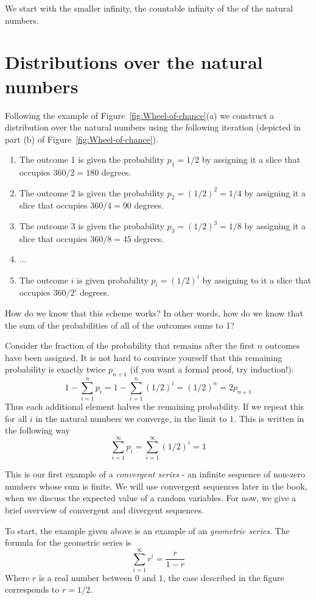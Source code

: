 We start with the smaller infinity, the countable infinity of the of the natural numbers.

\section{Distributions over the natural numbers}
Following the example of Figure~\ref{fig:Wheel-of-chance}(a) we
construct a distribution over the natural numbers using the following
iteration (depicted in part (b) of Figure~\ref{fig:Wheel-of-chance}).
\begin{enumerate}
\item The outcome 1 is given the probability $p_1=1/2$ by assigning it a
  slice that occupies $360/2 = 180$ degrees.
\item The outcome 2 is given the probability $p_2=(1/2)^2=1/4$ by
  assigning it a slice that occupies $360/4=90$ degrees. 
\item The outcome 3 is given the probability $p_3=(1/2)^3=1/8$ by
  assigning it a slice that occupies $360/8=45$ degrees.
\item ...
\item The outcome $i$ is given probability $p_i=(1/2)^i$ by assigning to
  it a slice that occupies $360/2^i$ degrees. 
\end{enumerate}

How do we know that this scheme works? In other words, how do we know
that the sum of the probabilities of all of the outcomes sums to 1?

Consider the fraction of the probability that remains after the first
$n$ outcomes have been assigned. It is not hard to convince yourself
that this remaining probability is exactly twice $p_{n+1}$ (if you
want a formal proof, try induction!):
\[
1-\sum_{i=1}^n p_i = 1-\sum_{i=1}^n (1/2)^i = (1/2)^n= 2p_{n+1}
\]
Thus each additional element halves the remaining probability. If we
repeat this for all $i$ in the natural numbers we converge, in the
limit to $1$. This is written in the following way
\[
\sum_{i=1}^{\infty} p_i = \sum_{i=1}^{\infty} (1/2)^i = 1
\]

This is our first example of a {\em convergent series} - an infinite
sequence of non-zero numbers whose sum is finite. We will use
convergent sequences later in the book, when we discuss the expected
value of a random variables. For now, we give a brief overview of
convergent and divergent sequences.

To start, the example given above is an example of an {\em geometric
  series}. The formula for the geometric series is 
\[
\sum_{i=1}^{\infty} r^i = \frac{r}{1-r}
\]
Where $r$ is a real number between $0$ and $1$, the case described in
the figure corresponds to $r=1/2$.

